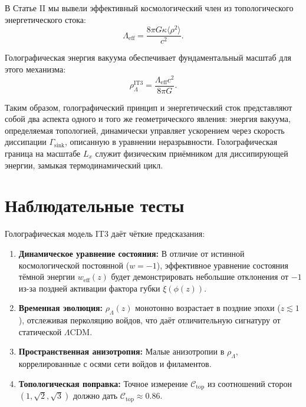 \documentclass[12pt,a4paper]{article}
\begin{document}
В Статье II мы вывели эффективный космологический член из топологического энергетического стока:
\begin{equation}
\Lambda_{\mathrm{eff}} = \frac{8\pi G \kappa \langle \rho^2 \rangle}{c^2}.
\end{equation}

Голографическая энергия вакуума обеспечивает фундаментальный масштаб для этого механизма:
\begin{equation}
\rho_{\Lambda}^{\mathrm{IT3}} = \frac{\Lambda_{\mathrm{eff}} c^2}{8\pi G}.
\end{equation}

Таким образом, голографический принцип и энергетический сток представляют собой два аспекта одного и того же геометрического явления: энергия вакуума, определяемая топологией, динамически управляет ускорением через скорость диссипации $\Gamma_{\mathrm{sink}}$, описанную в уравнении неразрывности. Голографическая граница на масштабе $L_x$ служит физическим приёмником для диссипирующей энергии, замыкая термодинамический цикл.

\section{Наблюдательные тесты}

Голографическая модель IT3 даёт чёткие предсказания:

\begin{enumerate}
    \item \textbf{Динамическое уравнение состояния:} В отличие от истинной космологической постоянной ($w=-1$), эффективное уравнение состояния тёмной энергии $w_{\mathrm{eff}}(z)$ будет демонстрировать небольшие отклонения от $-1$ из-за поздней активации фактора губки $\xi(\phi(z))$.
    
    \item \textbf{Временная эволюция:} $\rho_{\Lambda}(z)$ монотонно возрастает в поздние эпохи ($z \lesssim 1$), отслеживая перколяцию войдов, что даёт отличительную сигнатуру от статической $\Lambda$CDM.
    
    \item \textbf{Пространственная анизотропия:} Малые анизотропии в $\rho_{\Lambda}$, коррелированные с осями сети войдов и филаментов.
    
    \item \textbf{Топологическая поправка:} Точное измерение $\mathcal{C}_{\mathrm{top}}$ из соотношений сторон $(1, \sqrt{2}, \sqrt{3})$ должно дать $\mathcal{C}_{\mathrm{top}} \approx 0.86$.
\end{enumerate}
\end{document}
